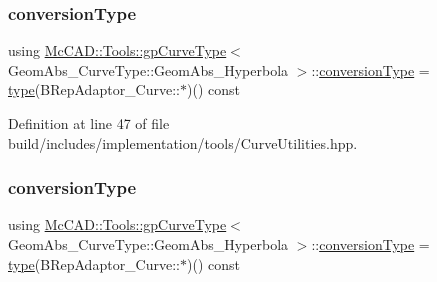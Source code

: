 \subsubsection{\texorpdfstring{conversion\+Type}{conversionType}\hspace{0.1cm}{\footnotesize\ttfamily [1/2]}}
{\footnotesize\ttfamily using \hyperlink{structMcCAD_1_1Tools_1_1gpCurveType}{Mc\+C\+A\+D\+::\+Tools\+::gp\+Curve\+Type}$<$ Geom\+Abs\+\_\+\+Curve\+Type\+::\+Geom\+Abs\+\_\+\+Hyperbola $>$\+::\hyperlink{structMcCAD_1_1Tools_1_1gpCurveType_3_01GeomAbs__CurveType_1_1GeomAbs__Hyperbola_01_4_a0b812f11998e2a5801e6a5b91e1b303c}{conversion\+Type} =  \hyperlink{structMcCAD_1_1Tools_1_1gpCurveType_3_01GeomAbs__CurveType_1_1GeomAbs__Hyperbola_01_4_aca7ee4ad0c710243b8a164ee15f28ccd}{type}(B\+Rep\+Adaptor\+\_\+\+Curve\+::$\ast$)() const}



Definition at line 47 of file build/includes/implementation/tools/\+Curve\+Utilities.\+hpp.

\mbox{\label{structMcCAD_1_1Tools_1_1gpCurveType_3_01GeomAbs__CurveType_1_1GeomAbs__Hyperbola_01_4_a0b812f11998e2a5801e6a5b91e1b303c}} 
\subsubsection{\texorpdfstring{conversion\+Type}{conversionType}\hspace{0.1cm}{\footnotesize\ttfamily [2/2]}}
{\footnotesize\ttfamily using \hyperlink{structMcCAD_1_1Tools_1_1gpCurveType}{Mc\+C\+A\+D\+::\+Tools\+::gp\+Curve\+Type}$<$ Geom\+Abs\+\_\+\+Curve\+Type\+::\+Geom\+Abs\+\_\+\+Hyperbola $>$\+::\hyperlink{structMcCAD_1_1Tools_1_1gpCurveType_3_01GeomAbs__CurveType_1_1GeomAbs__Hyperbola_01_4_a0b812f11998e2a5801e6a5b91e1b303c}{conversion\+Type} =  \hyperlink{structMcCAD_1_1Tools_1_1gpCurveType_3_01GeomAbs__CurveType_1_1GeomAbs__Hyperbola_01_4_aca7ee4ad0c710243b8a164ee15f28ccd}{type}(B\+Rep\+Adaptor\+\_\+\+Curve\+::$\ast$)() const}



